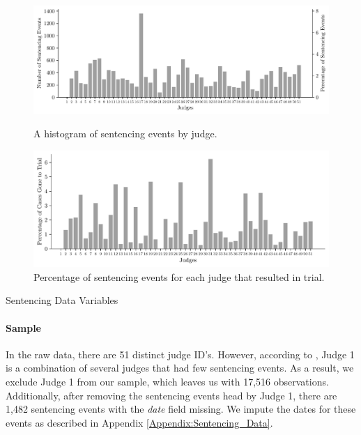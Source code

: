 \documentclass[11pt, oneside]{article}   	%
\theoremstyle{ModifiedStyle}
\begin{document}
		\begin{figure}[H]
			\centering
			\vspace{-2mm}
			\begin{minipage}{\textwidth}
				\vspace{-0mm}
				\centering
				\includegraphics[scale=0.65]{Figures/Judge_Histogram}
				\vspace{-4mm}
				\caption{A histogram of sentencing events by judge.}
				\label{Figure_Hester_Data_Judge_Histogram}
			\end{minipage}
			\begin{minipage}{\textwidth}
				\vspace{-0.5mm}
				\centering
				\includegraphics[scale=0.65]{Figures/Judge_Trial_Percentage_Histogram}
				\vspace{-4mm}
				\caption{Percentage of sentencing events for each judge that resulted in trial.}
				\label{Figure_Hester_Data_Judge_Trial_Percentage_Histogram}
			\end{minipage}
		\end{figure}

    \begin{table}[H]
      \caption{Sentencing Data Variables}
      \label{sent-vars}
      
    \end{table}

    \paragraph{Sample} In the raw data, there are 51 distinct judge ID's.   However, according to \cite{hester2017conditional}, Judge 1 is a combination of several judges that had few sentencing events. As a result, we exclude Judge 1 from our sample, which leaves us with 17,516 observations. Additionally, after removing the sentencing events head by Judge 1, there are 1,482 sentencing events with the \textit{date} field missing. We impute the dates for these events as described in Appendix \ref{Appendix:Sentencing_Data}.
\end{document}
